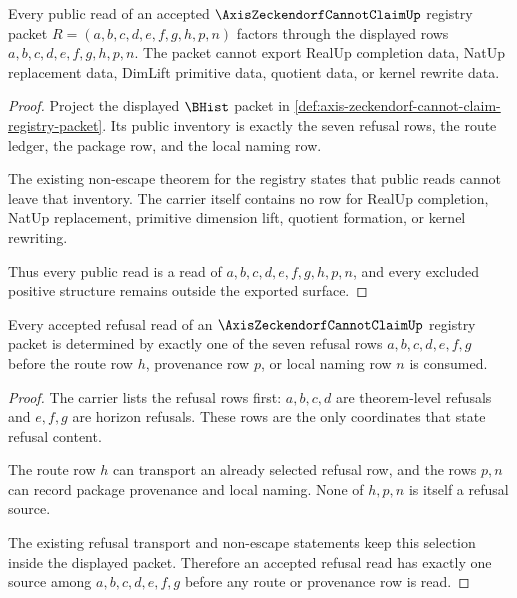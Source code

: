 \begin{theorem}
\label{thm:axis-zeckendorf-cannot-claim-public-boundary}
Every public read of an accepted $\AxisZeckendorfCannotClaimUp$ registry packet $R=(a,b,c,d,e,f,g,h,p,n)$ factors through the displayed rows $a,b,c,d,e,f,g,h,p,n$. The packet cannot export RealUp completion data, NatUp replacement data, DimLift primitive data, quotient data, or kernel rewrite data.
\end{theorem}
\begin{proof}
Project the displayed $\BHist$ packet in \autoref{def:axis-zeckendorf-cannot-claim-registry-packet}. Its public inventory is exactly the seven refusal rows, the route ledger, the package row, and the local naming row.

The existing non-escape theorem for the registry states that public reads cannot leave that inventory. The carrier itself contains no row for RealUp completion, NatUp replacement, primitive dimension lift, quotient formation, or kernel rewriting.

Thus every public read is a read of $a,b,c,d,e,f,g,h,p,n$, and every excluded positive structure remains outside the exported surface.
\end{proof}

\begin{theorem}
\label{thm:axis-zeckendorf-cannot-claim-refusal-ledger-row}
Every accepted refusal read of an $\AxisZeckendorfCannotClaimUp$ registry packet is determined by exactly one of the seven refusal rows $a,b,c,d,e,f,g$ before the route row $h$, provenance row $p$, or local naming row $n$ is consumed.
\end{theorem}
\begin{proof}
The carrier lists the refusal rows first: $a,b,c,d$ are theorem-level refusals and $e,f,g$ are horizon refusals. These rows are the only coordinates that state refusal content.

The route row $h$ can transport an already selected refusal row, and the rows $p,n$ can record package provenance and local naming. None of $h,p,n$ is itself a refusal source.

The existing refusal transport and non-escape statements keep this selection inside the displayed packet. Therefore an accepted refusal read has exactly one source among $a,b,c,d,e,f,g$ before any route or provenance row is read.
\end{proof}

